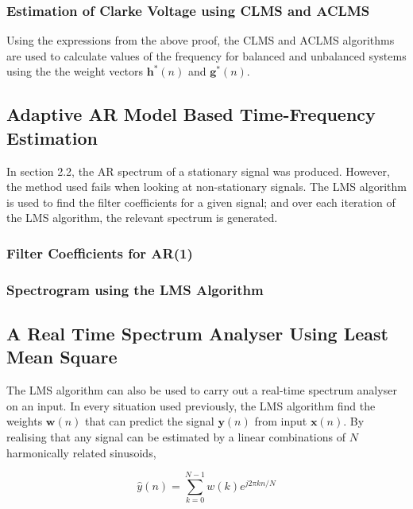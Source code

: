 \documentclass[main.tex]{subfiles}
\begin{document}
\subsubsection{Estimation of Clarke Voltage using CLMS and ACLMS}

Using the expressions from the above proof, the CLMS and ACLMS algorithms are used to calculate values of the frequency for balanced and unbalanced systems using the the weight vectors $\textbf{h}^*(n)$ and $\textbf{g}^*(n)$. 

\subsection{Adaptive AR Model Based Time-Frequency Estimation}

In section 2.2, the AR spectrum of a stationary signal was produced. However, the method used fails when looking at non-stationary signals. The LMS algorithm is used to find the filter coefficients for a given signal; and over each iteration of the LMS algorithm, the relevant spectrum is generated. 

\subsubsection{Filter Coefficients for AR(1)}

\subsubsection{Spectrogram using the LMS Algorithm}







\subsection{A Real Time Spectrum Analyser Using Least Mean Square}

The LMS algorithm can also be used to carry out a real-time spectrum analyser on an input. In every situation used previously, the LMS algorithm find the weights $\textbf{w}(n)$ that can predict the signal $\textbf{y}(n)$ from input $\textbf{x}(n)$. By realising that any signal can be estimated by a linear combinations of $N$ harmonically related sinusoids,

\begin{equation*}
\hat{y}(n) = \sum_{k=0}^{N-1}w(k)e^{j2\pi kn/N}
\end{equation*}
\end{document}
